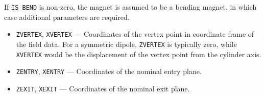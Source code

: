 If \verb|IS_BEND| is non-zero, the magnet is assumed to be a bending magnet, in which case additional
parameters are required.
\begin{itemize}
\item \verb|ZVERTEX|, \verb|XVERTEX| --- Coordinates of the vertex point in coordinate frame of the field data.
  For a symmetric dipole, \verb|ZVERTEX| is typically zero, while \verb|XVERTEX| would be the displacement of
  the vertex point from the cylinder axis.
\item \verb|ZENTRY|, \verb|XENTRY| --- Coordinates of the nominal entry plane.
\item \verb|ZEXIT|, \verb|XEXIT| --- Coordinates of the nominal exit plane.
\end{itemize}
